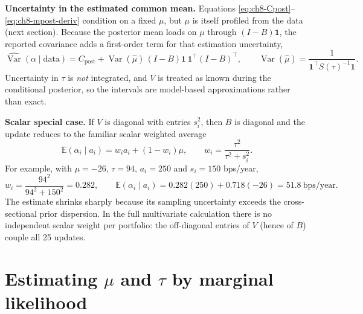 \textbf{Uncertainty in the estimated common mean.} Equations
\eqref{eq:ch8-Cpost}--\eqref{eq:ch8-mpost-deriv} condition on a fixed $\mu$,
but $\mu$ is itself profiled from the data (next section). Because the
posterior mean loads on $\mu$ through $(I-B)\mathbf{1}$, the reported
covariance adds a first-order term for that estimation uncertainty,
\begin{equation}\label{eq:ch8-muterm}
\widehat{\operatorname{Var}}(\alpha\mid\text{data})
= C_{\mathrm{post}} + \operatorname{Var}(\hat\mu)\,(I-B)\mathbf{1}\,\mathbf{1}^{\top}(I-B)^{\top},
\qquad \operatorname{Var}(\hat\mu)=\frac{1}{\mathbf{1}^{\top}S(\tau)^{-1}\mathbf{1}} .
\end{equation}
Uncertainty in $\tau$ is \emph{not} integrated, and $V$ is treated as known
during the conditional posterior, so the intervals are model-based
approximations rather than exact.

\textbf{Scalar special case.} If $V$ is diagonal with entries $s_i^2$, then
$B$ is diagonal and the update reduces to the familiar scalar weighted
average
\begin{equation}\label{eq:ch8-scalar}
\mathbb{E}(\alpha_i\mid a_i) = w_i a_i + (1-w_i)\mu,
\qquad w_i = \frac{\tau^2}{\tau^2+s_i^2}.
\end{equation}
For example, with $\mu=-26$, $\tau=94$, $a_i=250$ and $s_i=150$ bps/year,
\begin{equation}\label{eq:ch8-example}
w_i = \frac{94^2}{94^2+150^2} = 0.282,
\qquad
\mathbb{E}(\alpha_i\mid a_i) = 0.282(250)+0.718(-26) = 51.8\ \text{bps/year}.
\end{equation}
The estimate shrinks sharply because its sampling uncertainty exceeds the
cross-sectional prior dispersion. In the full multivariate calculation
there is no independent scalar weight per portfolio: the off-diagonal
entries of $V$ (hence of $B$) couple all 25 updates.

\hypertarget{estimating-ux3bc-and-ux3c4-by-marginal-likelihood}{%
\section{Estimating \ensuremath{\mu } and \ensuremath{\tau } by marginal
likelihood}\label{estimating-ux3bc-and-ux3c4-by-marginal-likelihood}}

